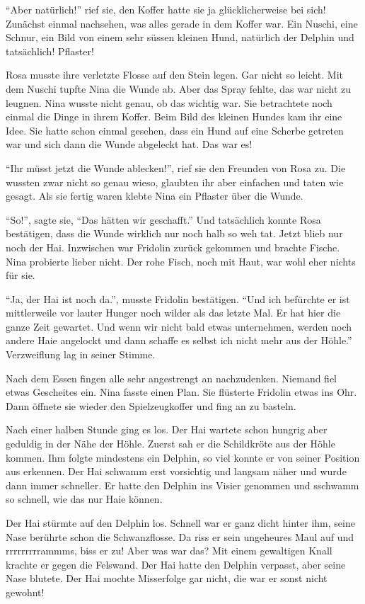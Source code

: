 \enquote{Aber natürlich!} rief sie, den Koffer hatte sie ja glücklicherweise bei sich! Zunächst einmal nachsehen, was alles gerade in dem Koffer war. Ein Nuschi, eine Schnur, ein Bild von einem sehr süssen kleinen Hund, natürlich der Delphin und tatsächlich! Pflaster! 

Rosa musste ihre verletzte Flosse auf den Stein legen. Gar nicht so leicht. Mit dem Nuschi tupfte Nina die Wunde ab. Aber das Spray fehlte, das war nicht zu leugnen. Nina wusste nicht genau, ob das wichtig war. Sie betrachtete noch einmal die Dinge in ihrem Koffer. Beim Bild des kleinen Hundes kam ihr eine Idee. Sie hatte schon einmal gesehen, dass ein Hund auf eine Scherbe getreten war und sich dann die Wunde abgeleckt hat. Das war es!

\enquote{Ihr müsst jetzt die Wunde ablecken!}, rief sie den Freunden von Rosa zu. Die wussten zwar nicht so genau wieso, glaubten ihr aber einfachen und taten wie gesagt. Als sie fertig waren klebte Nina ein Pflaster über die Wunde.

\enquote{So!}, sagte sie, \enquote{Das hätten wir geschafft.} Und tatsächlich konnte Rosa bestätigen, dass die Wunde wirklich nur noch halb so weh tat. Jetzt blieb nur noch der Hai. Inzwischen war Fridolin zurück gekommen und brachte Fische. Nina probierte lieber nicht. Der rohe Fisch, noch mit Haut, war wohl eher nichts für sie.

\enquote{Ja, der Hai ist noch da.}, musste Fridolin bestätigen. \enquote{Und ich befürchte er ist mittlerweile vor lauter Hunger noch wilder als das letzte Mal. Er hat hier die ganze Zeit gewartet. Und wenn wir nicht bald etwas unternehmen, werden noch andere Haie angelockt und dann schaffe es selbst ich nicht mehr aus der Höhle.} Verzweiflung lag in seiner Stimme.

Nach dem Essen fingen alle sehr angestrengt an nachzudenken. Niemand fiel etwas Gescheites ein. Nina fasste einen Plan. Sie flüsterte Fridolin etwas ins Ohr. Dann öffnete sie wieder den Spielzeugkoffer und fing an zu basteln. 

Nach einer halben Stunde ging es los. Der Hai wartete schon hungrig aber geduldig in der Nähe der Höhle. Zuerst sah er die Schildkröte aus der Höhle kommen. Ihm folgte mindestens ein Delphin, so viel konnte er von seiner Position aus erkennen. Der Hai schwamm erst vorsichtig und langsam näher und wurde dann immer schneller. Er hatte den Delphin ins Visier genommen und sschwamm so schnell, wie das nur Haie können.

Der Hai stürmte auf den Delphin los. Schnell war er ganz dicht hinter ihm, seine Nase berührte schon die Schwanzflosse. Da riss er sein ungeheures Maul auf und rrrrrrrrrammms, biss er zu! Aber was war das? Mit einem gewaltigen Knall krachte er gegen die Felswand. Der Hai hatte den Delphin verpasst, aber seine Nase blutete. Der Hai mochte Misserfolge gar nicht, die war er sonst nicht gewohnt!

